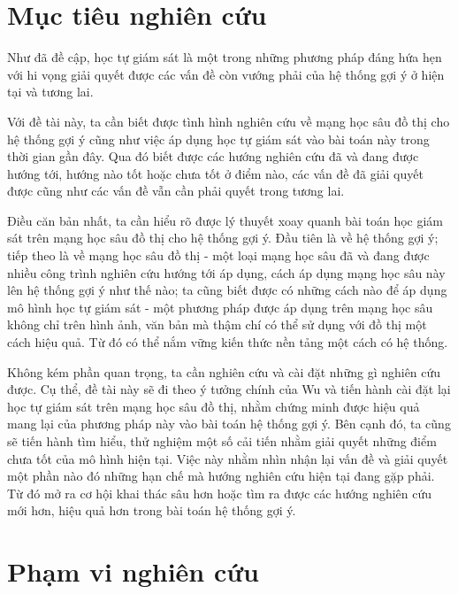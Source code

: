 \section{Mục tiêu nghiên cứu}

\noindent Như đã đề cập, học tự giám sát là một trong những phương pháp đáng hứa hẹn với hi vọng giải quyết được các vấn đề còn vướng phải của hệ thống gợi ý ở hiện tại và tương lai. 

Với đề tài này, ta cần biết được tình hình nghiên cứu về mạng học sâu đồ thị cho hệ thống gợi ý cũng như việc áp dụng học tự giám sát vào bài toán này trong thời gian gần đây. Qua đó biết được các hướng nghiên cứu đã và đang được hướng tới, hướng nào tốt hoặc chưa tốt ở điểm nào, các vấn đề đã giải quyết được cũng như các vấn đề vẫn cần phải quyết trong tương lai.

Điều căn bản nhất, ta cần hiểu rõ được lý thuyết xoay quanh bài toán học giám sát trên mạng học sâu đồ thị cho hệ thống gợi ý. Đầu tiên là về hệ thống gợi ý; tiếp theo là về mạng học sâu đồ thị - một loại mạng học sâu đã và đang được nhiều công trình nghiên cứu hướng tới áp dụng, cách áp dụng mạng học sâu này lên hệ thống gợi ý như thế nào; ta cũng biết được có những cách nào để áp dụng mô hình học tự giám sát - một phương pháp được áp dụng trên mạng học sâu không chỉ trên hình ảnh, văn bản mà thậm chí có thể sử dụng với đồ thị một cách hiệu quả. Từ đó có thể nắm vững kiến thức nền tảng một cách có hệ thống.

Không kém phần quan trọng, ta cần nghiên cứu và cài đặt những gì nghiên cứu được. Cụ thể, đề tài này sẽ đi theo ý tưởng chính của Wu \cite{SGL} và tiến hành cài đặt lại học tự giám sát trên mạng học sâu đồ thị, nhằm chứng minh được hiệu quả mang lại của phương pháp này vào bài toán hệ thống gợi ý. Bên cạnh đó, ta cũng sẽ tiến hành tìm hiểu, thử nghiệm một số cải tiến nhằm giải quyết những điểm chưa tốt của mô hình hiện tại. Việc này nhằm nhìn nhận lại vấn đề và giải quyết một phần nào đó những hạn chế mà hướng nghiên cứu hiện tại đang gặp phải. Từ đó mở ra cơ hội khai thác sâu hơn hoặc tìm ra được các hướng nghiên cứu mới hơn, hiệu quả hơn trong bài toán hệ thống gợi ý.

\section{Phạm vi nghiên cứu}

